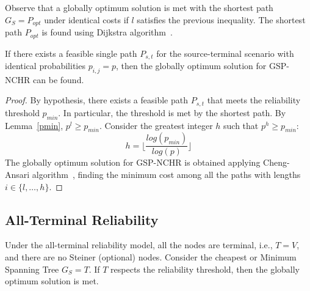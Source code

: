 Observe that a globally optimum solution is met with the shortest path $G_S=P_{opt}$ 
under identical costs if $l$ satisfies the previous inequality. The shortest path $P_{opt}$ is found using Dijkstra algorithm~\cite{20}.
%
%

\begin{proposition}
If there exists a feasible single path $P_{s,t}$ for the source-terminal scenario with identical probabilities $p_{i,j}=p$, then the globally optimum solution for GSP-NCHR can be found.  
\end{proposition}
\begin{proof}
By hypothesis, there exists a feasible path $P_{s,t}$ that meets the reliability threshold $p_{min}$. In particular, the threshold is 
met by the shortest path. By Lemma~\ref{pmin}, $p^l \geq p_{min}$. Consider the greatest integer $h$ such that $p^h \geq p_{min}$:
\begin{equation}
h = \lfloor \frac{log(p_{min})}{log(p)} \rfloor
\end{equation}
The globally optimum solution for GSP-NCHR is obtained applying Cheng-Ansari algorithm~\cite{102}, finding the minimum cost among all the paths with lengths $i\in \{l,\ldots,h\}$.  
\end{proof}

\subsection*{All-Terminal Reliability}
Under the all-terminal reliability model, all the nodes are terminal, i.e., $T=V$, and there are no Steiner (optional) nodes. 
Consider the cheapest or Minimum Spanning Tree $G_S=T$. If $T$ respects the reliability threshold, then the globally optimum solution is met.

